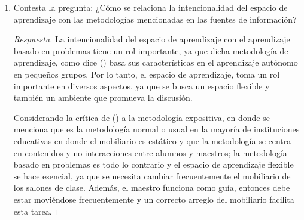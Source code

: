 \begin{enumerate}
\begin{itemize}
        \item ¿Qué elementos  debería incluirse en el  espacio de  aprendizaje, de  acuerdo a la metodología?	
        \begin{proof}[Respuesta]
            Los elementos que debe incluirse en el espacio de aprendizaje son los siguientes, considerando a  \citeauthor{poot2013retos} (\citeyear{poot2013retos}):
            \begin{itemize}
                \item El maestro o tutor no tiene un rol relevante, es el alumno quien guía su aprendizaje. 
                \item El método se basa en trabajar en equipo, siempre preservando que los grupos sean pequeños. 
                \item La discusión debe ser un elemento esencial al usar este método.
                \item El aprendizaje es activo, son los mismos estudiantes quienes buscan nuevo conocimiento. 
            \end{itemize}
        \end{proof}
        
        \item ¿Qué me gustaría  indagar a mayor  profundidad?
        \begin{proof}[Respuesta]
            Realmente, me gustaría indagar más en esta metodología y de alguna manera adquirir nuevas estrategias para mi propio aprendizaje. Esencialmente, sería bueno encontrar posibles utilidades en mi vida cotidiana. 
        \end{proof}
    \end{itemize}
    
    
    \item Contesta la pregunta: ¿Cómo se relaciona la intencionalidad del espacio de aprendizaje con las metodologías mencionadas en las fuentes de información? 
    \begin{proof}[Respuesta] 
        La intencionalidad del espacio de aprendizaje con el aprendizaje basado en problemas tiene un rol importante, ya que dicha metodología de aprendizaje, como dice \citeauthor{morales2004aprendizaje} (\citeyear{morales2004aprendizaje}) basa sus características en el aprendizaje autónomo en pequeños grupos. Por lo tanto, el espacio de aprendizaje, toma un rol importante en diversos aspectos, ya que se busca un espacio flexible y también un ambiente que promueva la discusión.

        Considerando la crítica de \citeauthor{morales2004aprendizaje} (\citeyear{morales2004aprendizaje}) a la metodología expositiva, en donde se menciona que es la metodología normal o usual en la mayoría de instituciones educativas en donde el mobiliario es estático y que la metodología se centra en contenidos y no interacciones entre alumnos y maestros; la metodología basado en problemas es todo lo contrario y el espacio de aprendizaje flexible se hace esencial, ya que se necesita cambiar frecuentemente el mobiliario de los salones de clase. Además, el maestro funciona como guía, entonces debe estar moviéndose frecuentemente y un correcto arreglo del mobiliario facilita esta tarea. 


\end{proof}
\end{enumerate}
